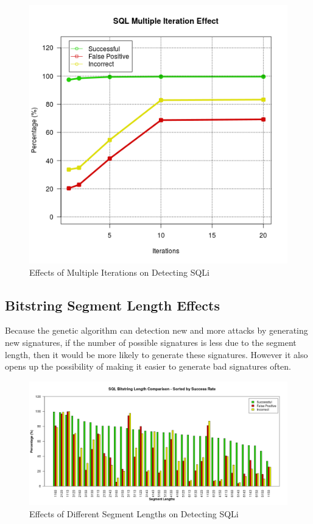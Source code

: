 \begin{figure}
	\label{fig:resIterations}
	\includegraphics[width=450px]{./assets/results/ga/iterations/Results_SQL.png}
	\caption{Effects of Multiple Iterations on Detecting SQLi}
\end{figure}

\subsection{Bitstring Segment Length Effects}

Because the genetic algorithm can detection new and more attacks by generating new signatures, if the number of possible signatures is less due to the segment length, then it would be more likely to generate these signatures.  However it also opens up the possibility of making it easier to generate bad signatures often.

\begin{figure}
	\label{fig:resLength}
	\includegraphics[width=450px]{./assets/results/ga/bitlength/Results_SuccessRate_SQL.png}
	\caption{Effects of Different Segment Lengths on Detecting SQLi}
\end{figure}

